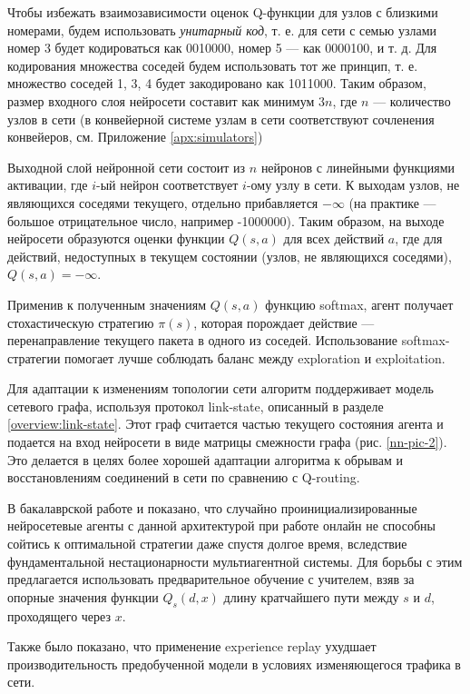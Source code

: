 \documentclass[specification,annotation,times]{itmo-student-thesis}
\theoremstyle{definition}
\begin{document}
Чтобы избежать взаимозависимости оценок Q-функции для узлов с близкими номерами, будем
использовать \textit{унитарный код}, т. е. для сети с семью узлами номер 3 будет
кодироваться как 0010000, номер 5 --- как 0000100, и т. д. Для кодирования
множества соседей будем использовать тот же принцип, т. е. множество соседей 1,
3, 4 будет закодировано как 1011000. Таким образом, размер входного
слоя нейросети составит как минимум $3n$, где $n$ --- количество узлов в сети (в
конвейерной системе узлам в сети соответствуют сочленения конвейеров, см.
Приложение \ref{apx:simulators})

Выходной слой нейронной сети состоит из $n$
нейронов с линейными функциями активации, где $i$-ый нейрон
соответствует $i$-ому узлу в сети. К выходам узлов, не являющихся соседями
текущего, отдельно прибавляется $-\infty$ (на практике --- большое отрицательное
число, например -1000000). Таким образом, на выходе нейросети образуются оценки
функции $Q(s, a)$ для всех действий $a$, где для действий, недоступных в текущем
состоянии (узлов, не являющихся соседями), $Q(s, a) = -\infty$.

Применив к полученным значениям $Q(s, a)$ функцию softmax, агент получает
стохастическую стратегию $\pi(s)$, которая порождает действие ---
перенаправление текущего пакета в одного из соседей. Использование
softmax-стратегии помогает лучше соблюдать баланс между exploration и
exploitation.

Для адаптации к изменениям топологии сети алгоритм поддерживает модель сетевого
графа, используя протокол link-state, описанный в разделе
\ref{overview:link-state}. Этот граф считается частью текущего состояния агента
и подается на вход нейросети в виде матрицы смежности графа (рис.
\ref{nn-pic-2}). Это делается в целях более хорошей адаптации алгоритма к
обрывам и восстановлениям соединений в сети по сравнению с Q-routing.

В бакалаврской работе и \cite{mukhutdinov2019multi} показано, что случайно
проинициализированные нейросетевые агенты с данной архитектурой при работе
онлайн не способны сойтись к оптимальной стратегии даже спустя долгое время,
вследствие фундаментальной нестационарности мультиагентной системы. Для борьбы с
этим предлагается использовать предварительное обучение с учителем, взяв за
опорные значения функции $Q_s(d, x)$ длину кратчайшего пути между $s$ и $d$,
проходящего через $x$.

Также было показано, что применение experience replay ухудшает
производительность предобученной модели в условиях изменяющегося трафика в сети.
\end{document}
